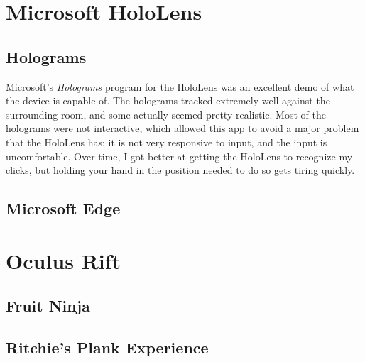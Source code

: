 \documentclass[11pt]{article}
\begin{document}
\section{Microsoft HoloLens}
\subsection{Holograms}
Microsoft's \textit{Holograms} program for the HoloLens was an excellent demo of what the 
device is capable of. The holograms tracked extremely well against the surrounding room,
and some actually seemed pretty realistic. Most of the holograms were not interactive,
which allowed this app to avoid a major problem that the HoloLens has: it is not very
responsive to input, and the input is uncomfortable. Over time, I got better at getting
the HoloLens to recognize my clicks, but holding your hand in the position needed to do so
gets tiring quickly.
\subsection{Microsoft Edge}
\section{Oculus Rift}
\subsection{Fruit Ninja}
\subsection{Ritchie's Plank Experience}
\end{document}
